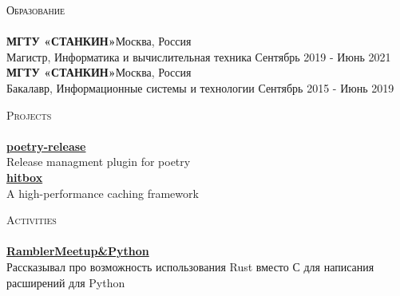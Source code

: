 \documentclass[a4paper]{article}
\newcommand{\lineunder} {
    \vspace*{-8pt} \\
    \hspace*{-18pt} \hrulefill \\
}
\newcommand{\header} [1] {
    {\hspace*{-18pt}\vspace*{6pt} \textsc{#1}}
    \vspace*{-6pt} \lineunder
}
\begin{document}
\newpage

\header{Образование}
\textbf{МГТУ «СТАНКИН»}\hfill Москва, Россия\\
Магистр, Информатика и вычислительная техника \hfill Сентябрь 2019 - Июнь 2021\\
\vspace{2mm}
\textbf{МГТУ «СТАНКИН»}\hfill Москва, Россия\\
Бакалавр, Информационные системы и технологии \hfill Сентябрь 2015 - Июнь 2019\\
\vspace{2mm}

\header{Projects}
{\textbf{\href{https://github.com/topenkoff/poetry-release}{poetry-release}}}\\
Release managment plugin for poetry\\

\vspace*{2mm}
{\textbf{\href{https://github.com/hit-box/hitbox}{hitbox}}}\\
A high-performance caching framework\\
\vspace*{2mm}



\header{Activities}
{\textbf{\href{https://www.youtube.com/watch?v=gpf_KOAmgzY&t=3040s}{RamblerMeetup\&Python}}}\\
Рассказывал про возможность использования Rust вместо С для написания расширений для Python
\vspace*{2mm}
\end{document}
